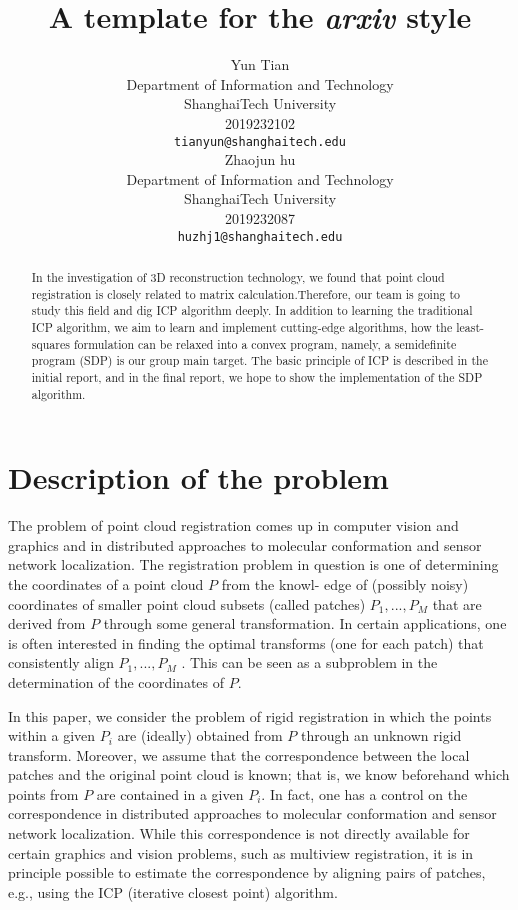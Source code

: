 \documentclass{article}
\title{A template for the \emph{arxiv} style}
\author{
	Yun Tian\\
	Department of Information and Technology\\
	ShanghaiTech University\\
	2019232102\\
	\texttt{tianyun@shanghaitech.edu} \\
	\And
	Zhaojun hu \\
	Department of Information and Technology\\
	ShanghaiTech University\\
	2019232087\\
	\texttt{huzhj1@shanghaitech.edu} \\
}
\begin{document}
	\maketitle
	
	\begin{abstract}
		In the investigation of 3D reconstruction technology, we found that point cloud registration is closely related to matrix calculation.Therefore, our team is going to study this field and dig ICP algorithm deeply. In addition to learning the traditional ICP algorithm, we aim to learn and implement cutting-edge algorithms, how the least-squares formulation can be relaxed into a convex program, namely, a semidefinite program (SDP) is our group main target. The basic principle of ICP is described in the initial report, and in the final report, we hope to show the implementation of the SDP algorithm.
	\end{abstract}
	
	
	\section{Description of the problem}
	The problem of point cloud registration comes up in computer vision and graphics and in distributed approaches to molecular conformation  and sensor network localization. The registration problem in question is one of determining the coordinates of a point cloud $P$ from the knowl- edge of (possibly noisy) coordinates of smaller point cloud subsets (called patches) $P_1 , . . . , P_M$ that are derived from $P$ through some general transformation. In certain applications, one is often interested in finding the optimal transforms (one for each patch) that consistently align $P_1, . . . , P_M$ . This can be seen as a subproblem in the determination of the coordinates of $P$.
	
	In this paper, we consider the problem of rigid registration in which the points within a given $P_i$ are (ideally) obtained from $P$ through an unknown rigid transform. Moreover, we assume that the correspondence between the local patches and the original point cloud is known; that is, we know beforehand which points from $P$ are contained in a given $P_i$. In fact, one has a control on the correspondence in distributed approaches to molecular conformation and sensor network localization. While this correspondence is not directly available for certain graphics and vision problems, such as multiview registration, it is in principle possible to estimate the correspondence by aligning pairs of patches, e.g., using the ICP (iterative closest point) algorithm.
	
\end{document}
